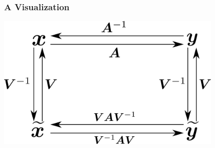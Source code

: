 \documentclass[aspectratio=169]{beamer}
\begin{document}
\begin{frame}
    \frametitle{A Visualization}

    \begin{center}
        \includegraphics[width=0.8\textwidth]{change-of-basis.png}
    \end{center}
\end{frame}


\end{document}
